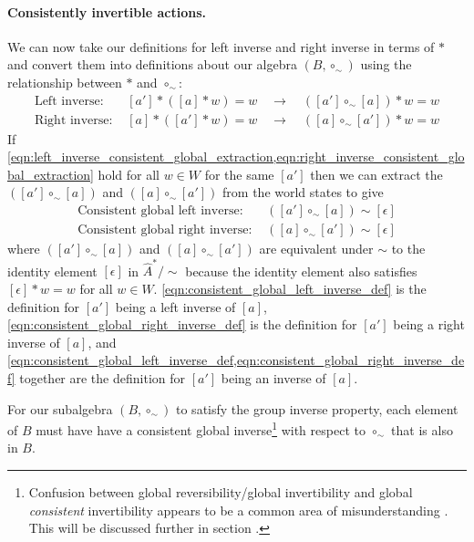 \paragraph{Consistently invertible actions.}
We can now take our definitions for left inverse and right inverse in terms of $\ast$ and convert them into definitions about our algebra $(B, \circ_{\sim})$ using the relationship between $\ast$ and $\circ_{\sim}$:
\begin{align}
    \text{Left inverse: } & [a'] * ([a] * w) = w \quad \to \quad ([a'] \circ_{\sim} [a]) \ast w = w
    \label{eqn:left_inverse_consistent_global_extraction} \\
    \text{Right inverse: } & [a] * ([a'] * w) = w \quad \to \quad ([a] \circ_{\sim} [a']) \ast w = w
    \label{eqn:right_inverse_consistent_global_extraction}
\end{align}
If \cref{eqn:left_inverse_consistent_global_extraction,eqn:right_inverse_consistent_global_extraction} hold for all $w \in W$ for the same $[a']$ then we can extract the $([a'] \circ_{\sim} [a])$ and $([a] \circ_{\sim} [a'])$ from the world states to give
\begin{align}
    \text{Consistent global left inverse: } & ([a'] \circ_{\sim} [a]) \sim [\epsilon] 
    \label{eqn:consistent_global_left_inverse_def} \\
    \text{Consistent global right inverse: } & ([a] \circ_{\sim} [a']) \sim [\epsilon]
    \label{eqn:consistent_global_right_inverse_def}
\end{align}
where $([a'] \circ_{\sim} [a])$ and $([a] \circ_{\sim} [a'])$ are equivalent under $\sim$ to the identity element $[\epsilon]$ in $\hat{A}^{*}/\sim$ because the identity element also satisfies $[\epsilon] \ast w = w$ for all $w \in W$.
\cref{eqn:consistent_global_left_inverse_def} is the definition for $[a']$ being a left inverse of $[a]$, \cref{eqn:consistent_global_right_inverse_def} is the definition for $[a']$ being a right inverse of $[a]$, and \cref{eqn:consistent_global_left_inverse_def,eqn:consistent_global_right_inverse_def} together are the definition for $[a']$ being an inverse of $[a]$.

For our subalgebra $(B, \circ_{\sim})$ to satisfy the group inverse property, each element of $B$ must have have a consistent global inverse\footnote{
Confusion between global reversibility/global invertibility and global \emph{consistent} invertibility appears to be a common area of misunderstanding .
This will be discussed further in section .
} with respect to $\circ_{\sim}$ that is also in $B$.

